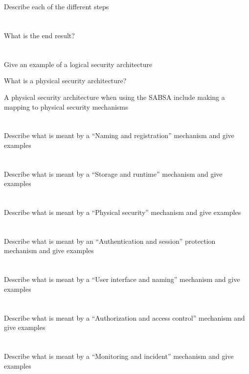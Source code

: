 \begin{questions}
\begin{parts}
  \part{} Describe each of the different steps
  \part{} What is the end result?
  \part{} Give an example of a logical security architecture
  \end{parts}

\item What is a physical security architecture?
\item A physical security architecture when using the SABSA include making a mapping to physical security mechanisms
  \begin{parts}
  \part{} Describe what is meant by a ``Naming and registration'' mechanism and give examples
  \part{} Describe what is meant by a ``Storage and runtime'' mechanism and give examples
  \part{} Describe what is meant by a ``Physical security'' mechanism and give examples
  \part{} Describe what is meant by an ``Authentication and session'' protection mechanism and give examples
  \part{} Describe what is meant by a ``User interface and naming'' mechanism and give examples
  \part{} Describe what is meant by a ``Authorization and access control'' mechanism and give examples
  \part{} Describe what is meant by a ``Monitoring and incident'' mechanism and give examples
  \end{parts}


\end{questions}
